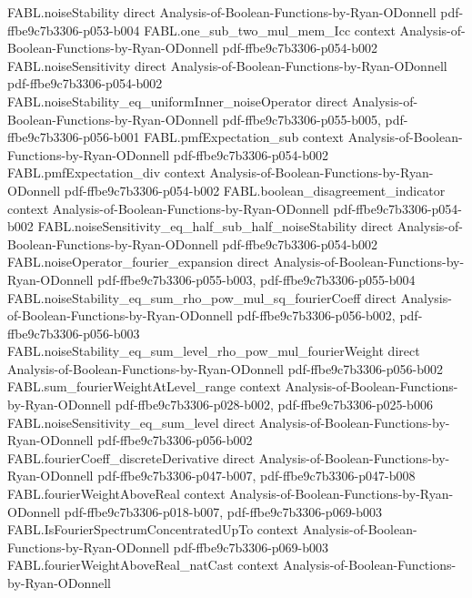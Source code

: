 \begin{theorem}
\proofstep
  {FABL.noiseStability}
  {direct}
  {Analysis-of-Boolean-Functions-by-Ryan-ODonnell}
  {pdf-ffbe9c7b3306-p053-b004}
\proofstep
  {FABL.one_sub_two_mul_mem_Icc}
  {context}
  {Analysis-of-Boolean-Functions-by-Ryan-ODonnell}
  {pdf-ffbe9c7b3306-p054-b002}
\proofstep
  {FABL.noiseSensitivity}
  {direct}
  {Analysis-of-Boolean-Functions-by-Ryan-ODonnell}
  {pdf-ffbe9c7b3306-p054-b002}
\proofstep
  {FABL.noiseStability_eq_uniformInner_noiseOperator}
  {direct}
  {Analysis-of-Boolean-Functions-by-Ryan-ODonnell}
  {pdf-ffbe9c7b3306-p055-b005,
    pdf-ffbe9c7b3306-p056-b001}
\proofstep
  {FABL.pmfExpectation_sub}
  {context}
  {Analysis-of-Boolean-Functions-by-Ryan-ODonnell}
  {pdf-ffbe9c7b3306-p054-b002}
\proofstep
  {FABL.pmfExpectation_div}
  {context}
  {Analysis-of-Boolean-Functions-by-Ryan-ODonnell}
  {pdf-ffbe9c7b3306-p054-b002}
\proofstep
  {FABL.boolean_disagreement_indicator}
  {context}
  {Analysis-of-Boolean-Functions-by-Ryan-ODonnell}
  {pdf-ffbe9c7b3306-p054-b002}
\proofstep
  {FABL.noiseSensitivity_eq_half_sub_half_noiseStability}
  {direct}
  {Analysis-of-Boolean-Functions-by-Ryan-ODonnell}
  {pdf-ffbe9c7b3306-p054-b002}
\proofstep
  {FABL.noiseOperator_fourier_expansion}
  {direct}
  {Analysis-of-Boolean-Functions-by-Ryan-ODonnell}
  {pdf-ffbe9c7b3306-p055-b003,
    pdf-ffbe9c7b3306-p055-b004}
\proofstep
  {FABL.noiseStability_eq_sum_rho_pow_mul_sq_fourierCoeff}
  {direct}
  {Analysis-of-Boolean-Functions-by-Ryan-ODonnell}
  {pdf-ffbe9c7b3306-p056-b002,
    pdf-ffbe9c7b3306-p056-b003}
\proofstep
  {FABL.noiseStability_eq_sum_level_rho_pow_mul_fourierWeight}
  {direct}
  {Analysis-of-Boolean-Functions-by-Ryan-ODonnell}
  {pdf-ffbe9c7b3306-p056-b002}
\proofstep
  {FABL.sum_fourierWeightAtLevel_range}
  {context}
  {Analysis-of-Boolean-Functions-by-Ryan-ODonnell}
  {pdf-ffbe9c7b3306-p028-b002,
    pdf-ffbe9c7b3306-p025-b006}
\proofstep
  {FABL.noiseSensitivity_eq_sum_level}
  {direct}
  {Analysis-of-Boolean-Functions-by-Ryan-ODonnell}
  {pdf-ffbe9c7b3306-p056-b002}
\proofstep
  {FABL.fourierCoeff_discreteDerivative}
  {direct}
  {Analysis-of-Boolean-Functions-by-Ryan-ODonnell}
  {pdf-ffbe9c7b3306-p047-b007,
    pdf-ffbe9c7b3306-p047-b008}
\proofstep
  {FABL.fourierWeightAboveReal}
  {context}
  {Analysis-of-Boolean-Functions-by-Ryan-ODonnell}
  {pdf-ffbe9c7b3306-p018-b007,
    pdf-ffbe9c7b3306-p069-b003}
\proofstep
  {FABL.IsFourierSpectrumConcentratedUpTo}
  {context}
  {Analysis-of-Boolean-Functions-by-Ryan-ODonnell}
  {pdf-ffbe9c7b3306-p069-b003}
\proofstep
  {FABL.fourierWeightAboveReal_natCast}
  {context}
  {Analysis-of-Boolean-Functions-by-Ryan-ODonnell}

\end{theorem}
